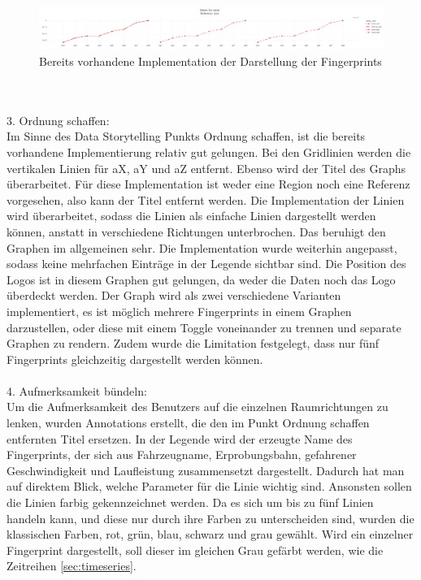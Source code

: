 \begin{figure}[!h]
    \centering
    \includegraphics[width=1\linewidth]{gfx/fingerprints_first.png}
    \caption{Bereits vorhandene Implementation der Darstellung der Fingerprints}
    \label{fig:fingerprints_first}
\end{figure}
\\\\3. Ordnung schaffen:\\
Im Sinne des Data Storytelling Punkts Ordnung schaffen, ist die bereits vorhandene Implementierung relativ gut gelungen. Bei den Gridlinien werden die vertikalen Linien für aX, aY und aZ entfernt. Ebenso wird der Titel des Graphs überarbeitet. Für diese Implementation ist weder eine Region noch eine Referenz vorgesehen, also kann der Titel entfernt werden. Die Implementation der Linien wird überarbeitet, sodass die Linien als einfache Linien dargestellt werden können, anstatt in verschiedene Richtungen unterbrochen. Das beruhigt den Graphen im allgemeinen sehr. Die Implementation wurde weiterhin angepasst, sodass keine mehrfachen Einträge in der Legende sichtbar sind. Die Position des Logos ist in diesem Graphen gut gelungen, da weder die Daten noch das Logo überdeckt werden. Der Graph wird als zwei verschiedene Varianten implementiert, es ist möglich mehrere Fingerprints in einem Graphen darzustellen, oder diese mit einem Toggle voneinander zu trennen und separate Graphen zu rendern. Zudem wurde die Limitation festgelegt, dass nur fünf Fingerprints gleichzeitig dargestellt werden können.\\\\
4. Aufmerksamkeit bündeln:\\
Um die Aufmerksamkeit des Benutzers auf die einzelnen Raumrichtungen zu lenken, wurden Annotations erstellt, die den im Punkt Ordnung schaffen entfernten Titel ersetzen. In der Legende wird der erzeugte Name des Fingerprints, der sich aus Fahrzeugname, Erprobungsbahn, gefahrener Geschwindigkeit und Laufleistung zusammensetzt dargestellt. Dadurch hat man auf direktem Blick, welche Parameter für die Linie wichtig sind. Ansonsten sollen die Linien farbig gekennzeichnet werden. Da es sich um bis zu fünf Linien handeln kann, und diese nur durch ihre Farben zu unterscheiden sind, wurden die klassischen Farben, rot, grün, blau, schwarz und grau gewählt. Wird ein einzelner Fingerprint dargestellt, soll dieser im gleichen Grau gefärbt werden, wie die Zeitreihen \ref{sec:timeseries}.\\\\
